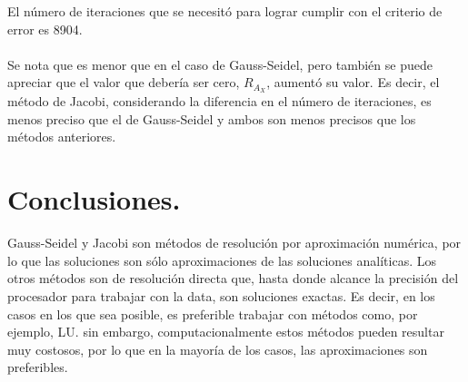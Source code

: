 \documentclass[12pt, notitlepage]{article}
\begin{document}
El número de iteraciones que se necesitó para lograr cumplir con el criterio de error es 8904.\\\\
Se nota que es menor que en el caso de Gauss-Seidel, pero también se puede apreciar que el valor que debería ser cero, $R_{A_X}$, aumentó su valor. Es decir, el método de Jacobi, considerando la diferencia en el número de iteraciones, es menos preciso que el de Gauss-Seidel y ambos son menos precisos que los métodos anteriores.

\newpage

\section{Conclusiones.}

Gauss-Seidel y Jacobi son métodos de resolución por aproximación numérica, por lo que las soluciones son sólo aproximaciones de las soluciones analíticas. Los otros métodos son de resolución directa que, hasta donde alcance la precisión del procesador para trabajar con la data, son soluciones exactas. Es decir, en los casos en los que sea posible, es preferible trabajar con métodos como, por ejemplo, LU. sin embargo, computacionalmente estos métodos pueden resultar muy costosos, por lo que en la mayoría de los casos, las aproximaciones son preferibles.

\newpage

\begin{thebibliography}{3}



\end{thebibliography}
\end{document}
